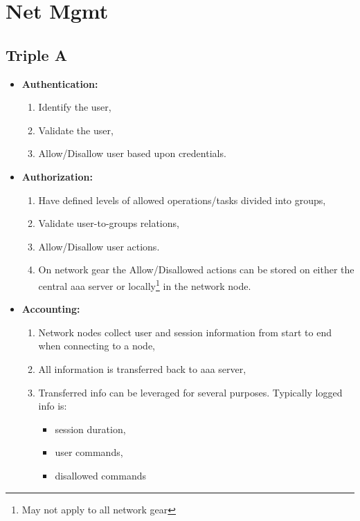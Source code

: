 \chapter{Net Mgmt}

\section{Triple A}



\newpage

\begin{itemize}
    \item \textbf{Authentication:}
    \begin{enumerate}
        \item Identify the user,
        \item Validate the user,
        \item Allow/Disallow user based upon credentials.
    \end{enumerate}
    \item \textbf{Authorization:}
    \begin{enumerate}
        \item Have defined levels of allowed operations/tasks divided into groups,
        \item Validate user-to-groups relations,
        \item Allow/Disallow user actions.
        \item On network gear the Allow/Disallowed actions can be stored on either the central \gls{aaa} server or locally\footnote{May not apply to all network gear} in the network node.
    \end{enumerate}
    \item \textbf{Accounting:}
    \begin{enumerate}
        \item Network nodes collect user and session information from start to end when connecting to a node,
        \item All information is transferred back to \gls{aaa} server,
        \item Transferred info can be leveraged for several purposes. Typically logged info is:
        \begin{itemize}
            \item session duration,
            \item user commands,
            \item disallowed commands
        \end{itemize}
    \end{enumerate}
\end{itemize}

